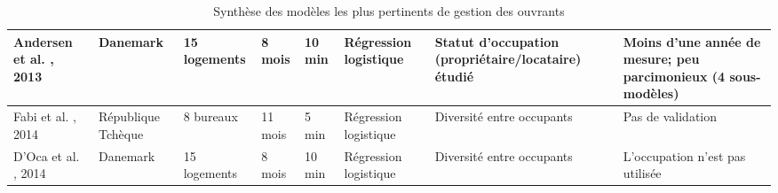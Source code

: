 \begin{landscape}
\begin{table} [H]
\begin{tabular}{|p{2.5cm}|p{2cm}|p{2cm}|p{2cm}|p{2cm}|p{2cm}|p{4cm}|p{4cm}|}
\hline 
Andersen et al. \cite{Andersen-13}, 2013 & Danemark & 15 logements & 8 mois & 10 min & Régression logistique & Statut d'occupation (propriétaire/locataire) étudié & Moins d'une année de mesure; peu parcimonieux (4 sous-modèles) \\ 
\hline 
Fabi et al. \cite{Fabi-14}, 2014 & République Tchèque & 8 bureaux & 11 mois & 5 min & Régression logistique & Diversité entre occupants & Pas de validation \\ 
\hline 
D'Oca et al. \cite{d'Oca-14}, 2014 & Danemark & 15 logements & 8 mois & 10 min & Régression logistique & Diversité entre occupants & L'occupation n'est pas utilisée \\ 
\hline 
\end{tabular}
\caption{Synthèse des modèles les plus pertinents de gestion des ouvrants}
\label{tab:WinPres}
\end{table}
\end{landscape}

